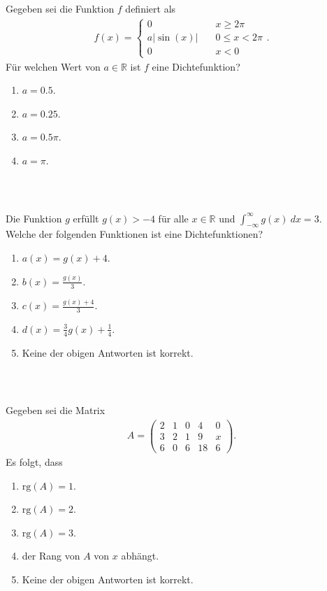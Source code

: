 \subsection*{}
Gegeben sei die Funktion $f $ definiert als 
\begin{align*}
	f(x)
	=
	\begin{cases}
		0 \quad & x \geq 2 \pi\\
		a | \sin(x)  | \quad &0 \leq x < 2 \pi\\
		0 \quad &x<0
	\end{cases}.
\end{align*}
Für welchen Wert von $a \in \mathbb{R}$ ist $f$ eine Dichtefunktion?
\renewcommand{\labelenumi}{(\alph{enumi})}
\begin{enumerate}
	\item 
	$a = 0.5$.
	\item
	$a =0.25$.
	\item
	$a = 0.5 \pi $.
	\item
	$a = \pi$.
\end{enumerate}
\ \\
\subsection*{}
Die Funktion $g$ erfüllt $g(x) > -4$ für alle $x \in \mathbb{R}$ und $\int_{- \infty}^\infty g(x) \ dx = 3$.\\
Welche der folgenden Funktionen ist eine Dichtefunktionen?
\renewcommand{\labelenumi}{(\alph{enumi})}
\begin{enumerate}
\item 
$ a(x) = g(x) + 4$.
\item 
$ b(x) = \frac{g(x)}{3}$.
\item
$ c(x) = \frac{g(x) + 4}{3} $.
\item
$ d(x) = \frac{3}{4} g(x) + \frac{1}{4} $.
\item
Keine der obigen Antworten ist korrekt.
\end{enumerate}
\ \\
\subsection*{}
Gegeben sei die Matrix
\begin{align*}
	A =
	\begin{pmatrix}
		2 & 1 & 0 & 4 & 0 \\
		3 & 2 & 1 & 9 & x \\
		6 & 0 & 6 & 18 & 6 
	\end{pmatrix}.
\end{align*}
Es folgt, dass
\renewcommand{\labelenumi}{(\alph{enumi})}
\begin{enumerate}
	\item 
	$ \mathrm{rg}(A) = 1 $.
	\item 
	$ \mathrm{rg}(A) = 2 $.
	\item
	$ \mathrm{rg}(A) = 3 $.
	\item
	der Rang von $A$ von $x$ abhängt.
	\item
	Keine der obigen Antworten ist korrekt.
\end{enumerate}
\ \\

